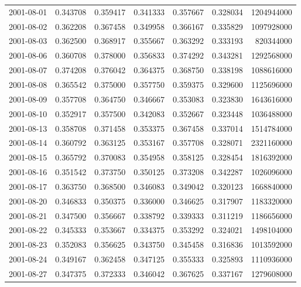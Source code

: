 \begin{tabular}{lrrrrrr}
2001-08-01 &    0.343708 &    0.359417 &    0.341333 &    0.357667 &    0.328034 &  1204944000 \\
2001-08-02 &    0.362208 &    0.367458 &    0.349958 &    0.366167 &    0.335829 &  1097928000 \\
2001-08-03 &    0.362500 &    0.368917 &    0.355667 &    0.363292 &    0.333193 &   820344000 \\
2001-08-06 &    0.360708 &    0.378000 &    0.356833 &    0.374292 &    0.343281 &  1292568000 \\
2001-08-07 &    0.374208 &    0.376042 &    0.364375 &    0.368750 &    0.338198 &  1088616000 \\
2001-08-08 &    0.365542 &    0.375000 &    0.357750 &    0.359375 &    0.329600 &  1125696000 \\
2001-08-09 &    0.357708 &    0.364750 &    0.346667 &    0.353083 &    0.323830 &  1643616000 \\
2001-08-10 &    0.352917 &    0.357500 &    0.342083 &    0.352667 &    0.323448 &  1036488000 \\
2001-08-13 &    0.358708 &    0.371458 &    0.353375 &    0.367458 &    0.337014 &  1514784000 \\
2001-08-14 &    0.360792 &    0.363125 &    0.353167 &    0.357708 &    0.328071 &  2321160000 \\
2001-08-15 &    0.365792 &    0.370083 &    0.354958 &    0.358125 &    0.328454 &  1816392000 \\
2001-08-16 &    0.351542 &    0.373750 &    0.350125 &    0.373208 &    0.342287 &  1026096000 \\
2001-08-17 &    0.363750 &    0.368500 &    0.346083 &    0.349042 &    0.320123 &  1668840000 \\
2001-08-20 &    0.346833 &    0.350375 &    0.336000 &    0.346625 &    0.317907 &  1183320000 \\
2001-08-21 &    0.347500 &    0.356667 &    0.338792 &    0.339333 &    0.311219 &  1186656000 \\
2001-08-22 &    0.345333 &    0.353667 &    0.334375 &    0.353292 &    0.324021 &  1498104000 \\
2001-08-23 &    0.352083 &    0.356625 &    0.343750 &    0.345458 &    0.316836 &  1013592000 \\
2001-08-24 &    0.349167 &    0.362458 &    0.347125 &    0.355333 &    0.325893 &  1110936000 \\
2001-08-27 &    0.347375 &    0.372333 &    0.346042 &    0.367625 &    0.337167 &  1279608000 \\

\end{tabular}
